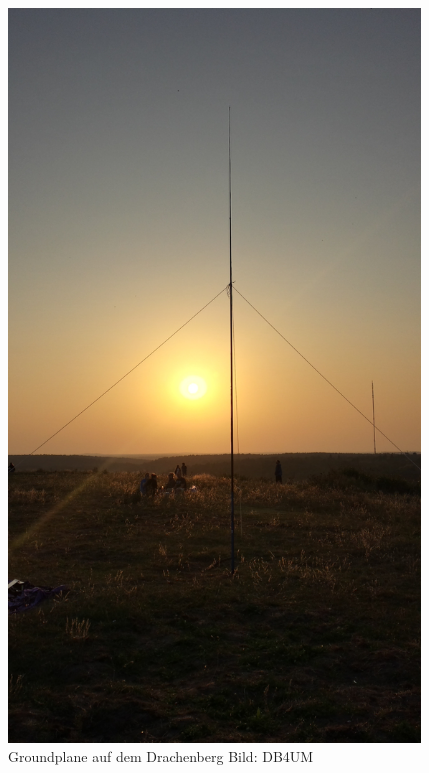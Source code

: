 \begin{frame}
\begin{columns}[c]
\begin{center}
      \includegraphics[width=0.82\textwidth]{a09/db4um_Drachenberg.jpg}\\
      \tiny Groundplane auf dem Drachenberg Bild: DB4UM
    \end{center}
  \end{columns}
\end{frame}

